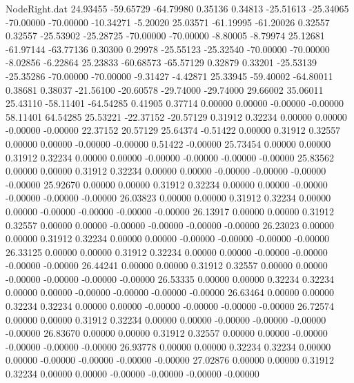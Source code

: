 \begin{filecontents}{NodeRight.dat}
  24.93455  -59.65729  -64.79980     0.35136    0.34813  -25.51613  -25.34065  -70.00000  -70.00000  -10.34271   -5.20020
  25.03571  -61.19995  -61.20026     0.32557    0.32557  -25.53902  -25.28725  -70.00000  -70.00000   -8.80005   -8.79974
  25.12681  -61.97144  -63.77136     0.30300    0.29978  -25.55123  -25.32540  -70.00000  -70.00000   -8.02856   -6.22864
  25.23833  -60.68573  -65.57129     0.32879    0.33201  -25.53139  -25.35286  -70.00000  -70.00000   -9.31427   -4.42871
  25.33945  -59.40002  -64.80011     0.38681    0.38037  -21.56100  -20.60578  -29.74000  -29.74000   29.66002   35.06011
  25.43110  -58.11401  -64.54285     0.41905    0.37714    0.00000    0.00000   -0.00000   -0.00000   58.11401   64.54285
  25.53221  -22.37152  -20.57129     0.31912    0.32234    0.00000    0.00000   -0.00000   -0.00000   22.37152   20.57129
  25.64374   -0.51422    0.00000     0.31912    0.32557    0.00000    0.00000   -0.00000   -0.00000    0.51422   -0.00000
  25.73454    0.00000    0.00000     0.31912    0.32234    0.00000    0.00000   -0.00000   -0.00000   -0.00000   -0.00000
  25.83562    0.00000    0.00000     0.31912    0.32234    0.00000    0.00000   -0.00000   -0.00000   -0.00000   -0.00000
  25.92670    0.00000    0.00000     0.31912    0.32234    0.00000    0.00000   -0.00000   -0.00000   -0.00000   -0.00000
  26.03823    0.00000    0.00000     0.31912    0.32234    0.00000    0.00000   -0.00000   -0.00000   -0.00000   -0.00000
  26.13917    0.00000    0.00000     0.31912    0.32557    0.00000    0.00000   -0.00000   -0.00000   -0.00000   -0.00000
  26.23023    0.00000    0.00000     0.31912    0.32234    0.00000    0.00000   -0.00000   -0.00000   -0.00000   -0.00000
  26.33125    0.00000    0.00000     0.31912    0.32234    0.00000    0.00000   -0.00000   -0.00000   -0.00000   -0.00000
  26.44241    0.00000    0.00000     0.31912    0.32557    0.00000    0.00000   -0.00000   -0.00000   -0.00000   -0.00000
  26.53335    0.00000    0.00000     0.32234    0.32234    0.00000    0.00000   -0.00000   -0.00000   -0.00000   -0.00000
  26.63464    0.00000    0.00000     0.32234    0.32234    0.00000    0.00000   -0.00000   -0.00000   -0.00000   -0.00000
  26.72574    0.00000    0.00000     0.31912    0.32234    0.00000    0.00000   -0.00000   -0.00000   -0.00000   -0.00000
  26.83670    0.00000    0.00000     0.31912    0.32557    0.00000    0.00000   -0.00000   -0.00000   -0.00000   -0.00000
  26.93778    0.00000    0.00000     0.32234    0.32234    0.00000    0.00000   -0.00000   -0.00000   -0.00000   -0.00000
  27.02876    0.00000    0.00000     0.31912    0.32234    0.00000    0.00000   -0.00000   -0.00000   -0.00000   -0.00000

\end{filecontents}
